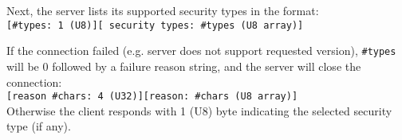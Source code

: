 \noindent
Next, the server lists its supported security types in the format:\\
{\tt [\#types: 1 (U8)][ security types: \#types (U8 array)]}

\noindent
If the connection failed (e.g. server does not support requested version), {\tt \#types} will be 0 followed by a failure reason string, and the server will close the connection: \\
{\tt [reason \#chars: 4 (U32)][reason: \#chars (U8 array)]} \\
Otherwise the client responds with 1 (U8) byte indicating the selected security type (if any).
